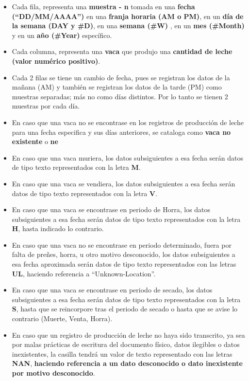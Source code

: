 \begin{itemize}
    \item Cada fila, representa una \textbf{muestra - n} tomada en una \textbf{fecha (``DD/MM/AAAA'')} en una \textbf{franja horaria (AM o PM)}, en un \textbf{día de la semana (DAY y \#D)}, en una \textbf{semana (\#W)} , en un \textbf{mes (\#Month)} y en un \textbf{año (\#Year)} específico.
    \item Cada columna, representa una \textbf{vaca} que produjo una \textbf{cantidad de leche (valor numérico positivo)}.
    \item Cada 2 filas se tiene un cambio de fecha, pues se registran los datos de la mañana (AM) y también se registran los datos de la tarde (PM) como muestras separadas; más no como días distintos. Por lo tanto se tienen 2 muestras por cada día.
    \item En caso que una vaca no se encontrase en los registros de producción de leche para una fecha especifica y sus días anteriores, se cataloga como \textbf{vaca no existente} o \textbf{ne}
    \item En caso que una vaca muriera, los datos subsiguientes a esa fecha serán datos de tipo texto representados con la letra \textbf{M}.
    \item En caso que una vaca se vendiera,  los datos subsiguientes a esa fecha serán datos de tipo texto representados con la letra \textbf{V}.
    \item En caso que una vaca se encontrase en periodo de Horra,  los datos subsiguientes a esa fecha serán datos de tipo texto representados con la letra \textbf{H}, hasta indicado lo contrario.
    \item En caso que una vaca no se encontrase en periodo determinado, fuera por falta de preñes, horra, u otro motivo desconocido,  los datos subsiguientes a esa fecha aproximada serán datos de tipo texto representados con las letras \textbf{UL}, haciendo referencia a ``Unknown-Location''.
    \item En caso que una vaca se encontrase en periodo de secado, los datos subsiguientes a esa fecha serán datos de tipo texto representados con la letra \textbf{S}, hasta que se reincorpore tras el periodo de secado o hasta que se avise lo contrario (Muerte, Venta, Horra).
    \item En caso que un registro de producción de leche no haya sido transcrito, ya sea por malas prácticas de escritura del documento físico, datos ilegibles o datos inexistentes, la casilla tendrá un valor de texto representado con las letras \textbf{NAN}, \textbf{haciendo referencia a un dato desconocido o dato inexistente por motivo desconocido}.

\end{itemize}
